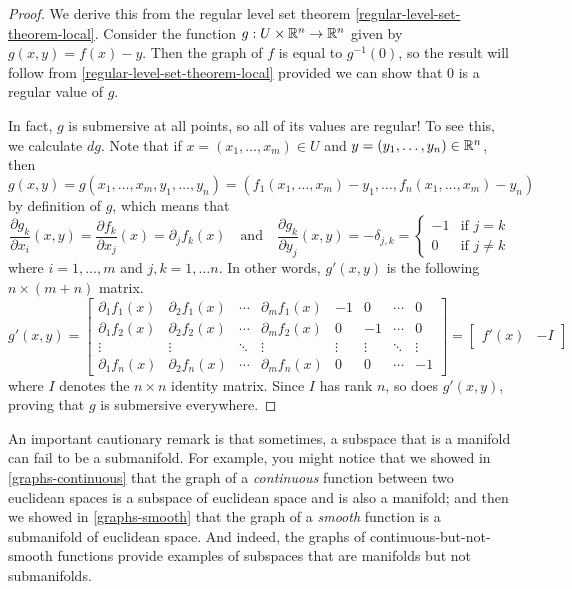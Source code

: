 \begin{proof}
	We derive this from the regular level set theorem \ref{regular-level-set-theorem-local}. Consider the function $g : U \times \mathbb{R}^n \to \mathbb{R}^n$ given by $g(x, y) = f(x) - y$. Then the graph of $f$ is equal to $g^{-1}(0)$, so the result will follow from \cref{regular-level-set-theorem-local} provided we can show that 0 is a regular value of $g$. 
	
	In fact, $g$ is submersive at all points, so all of its values are regular! To see this, we calculate $dg$. Note that if $x = (x_1, \dotsc, x_m) \in U$ and $y = (y_1, \dotsc, y_n) \in \mathbb{R}^n$, then
	\[ g(x,y) = g(x_1, \dotsc, x_m, y_1, \dotsc, y_n) = (f_1(x_1,\dotsc, x_m)-y_1, \dotsc, f_n(x_1, \dotsc, x_m) - y_n) \]
	by definition of $g$, which means that
	\[ \frac{\partial g_k}{\partial x_i}(x,y) = \frac{\partial f_k}{\partial x_j}(x) = \partial_j f_k(x) \quad \text{and} \quad \frac{\partial g_k}{\partial y_j}(x,y) = -\delta_{j,k} = \begin{cases} -1 & \text{if } j = k \\ 0 & \text{if } j \neq k \end{cases} \]
	where $i = 1, \dotsc, m$ and $j, k = 1, \dotsc n$. In other words, $g'(x,y)$ is the following $n \times (m+n)$ matrix. 
	\[ g'(x,y) = 
	\begin{bmatrix} 
	\partial_1 f_1(x) & \partial_2 f_1(x) & \dotsb & \partial_m f_1(x) & -1 & 0 & \dotsb & 0 \\ 
	\partial_1 f_2(x) & \partial_2 f_2(x) & \dotsb & \partial_m f_2(x) & 0 & -1 & \dotsb & 0 \\
	\vdots & \vdots & \ddots & \vdots & \vdots & \vdots & \ddots & \vdots \\ 
	\partial_1 f_n(x) & \partial_2 f_n(x) & \dotsb & \partial_m f_n(x) & 0 & 0 & \dotsb & -1 \end{bmatrix} = \begin{bmatrix} f'(x) & -I \end{bmatrix} \]
	where $I$ denotes the $n \times n$ identity matrix. Since $I$ has rank $n$, so does $g'(x,y)$, proving that $g$ is submersive everywhere. 
\end{proof}

An important cautionary remark is that sometimes, a subspace that is a manifold can fail to be a submanifold. For example, you might notice that we showed in \cref{graphs-continuous} that the graph of a \emph{continuous} function between two euclidean spaces is a subspace of euclidean space and is also a manifold; and then we showed in \cref{graphs-smooth} that the graph of a \emph{smooth} function is a submanifold of euclidean space. And indeed, the graphs of continuous-but-not-smooth functions provide examples of subspaces that are manifolds but not submanifolds. 

